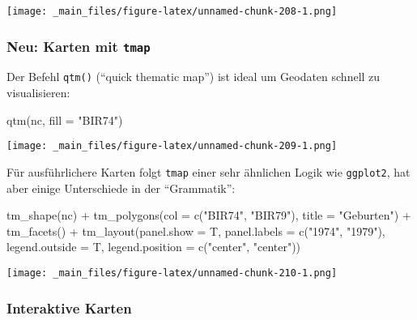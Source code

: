 \documentclass[
  ngerman,
]{article}
\newenvironment{Shaded}{\begin{snugshade}}{\end{snugshade}}
\newcommand{\AttributeTok}[1]{\textcolor[rgb]{0.77,0.63,0.00}{#1}}
\newcommand{\FunctionTok}[1]{\textcolor[rgb]{0.00,0.00,0.00}{#1}}
\newcommand{\NormalTok}[1]{#1}
\newcommand{\SpecialCharTok}[1]{\textcolor[rgb]{0.00,0.00,0.00}{#1}}
\newcommand{\StringTok}[1]{\textcolor[rgb]{0.31,0.60,0.02}{#1}}
\begin{document}
\texttt{[image: \_main\_files/figure-latex/unnamed-chunk-208-1.png]}

\hypertarget{neu-karten-mit-tmap}{%
\subsubsection{\texorpdfstring{Neu: Karten mit \texttt{tmap}}{Neu: Karten mit tmap}}\label{neu-karten-mit-tmap}}

Der Befehl \texttt{qtm()} (``quick thematic map'') ist ideal um Geodaten schnell zu visualisieren:

\begin{Shaded}
\begin{Highlighting}[]
\FunctionTok{qtm}\NormalTok{(nc, }\AttributeTok{fill =} \StringTok{"BIR74"}\NormalTok{)}
\end{Highlighting}
\end{Shaded}

\texttt{[image: \_main\_files/figure-latex/unnamed-chunk-209-1.png]}

Für ausführlichere Karten folgt \texttt{tmap} einer sehr ähnlichen Logik wie \texttt{ggplot2}, hat aber einige Unterschiede in der ``Grammatik'':

\begin{Shaded}
\begin{Highlighting}[]
\FunctionTok{tm\_shape}\NormalTok{(nc) }\SpecialCharTok{+}
  \FunctionTok{tm\_polygons}\NormalTok{(}\AttributeTok{col =} \FunctionTok{c}\NormalTok{(}\StringTok{"BIR74"}\NormalTok{, }\StringTok{"BIR79"}\NormalTok{), }\AttributeTok{title =} \StringTok{"Geburten"}\NormalTok{) }\SpecialCharTok{+}
  \FunctionTok{tm\_facets}\NormalTok{() }\SpecialCharTok{+}
  \FunctionTok{tm\_layout}\NormalTok{(}\AttributeTok{panel.show =}\NormalTok{ T,}
            \AttributeTok{panel.labels =} \FunctionTok{c}\NormalTok{(}\StringTok{"1974"}\NormalTok{, }\StringTok{"1979"}\NormalTok{),}
            \AttributeTok{legend.outside =}\NormalTok{ T, }\AttributeTok{legend.position =} \FunctionTok{c}\NormalTok{(}\StringTok{"center"}\NormalTok{, }\StringTok{"center"}\NormalTok{))}
\end{Highlighting}
\end{Shaded}

\texttt{[image: \_main\_files/figure-latex/unnamed-chunk-210-1.png]}

\hypertarget{interaktive-karten}{%
\subsubsection{Interaktive Karten}\label{interaktive-karten}}
\end{document}
